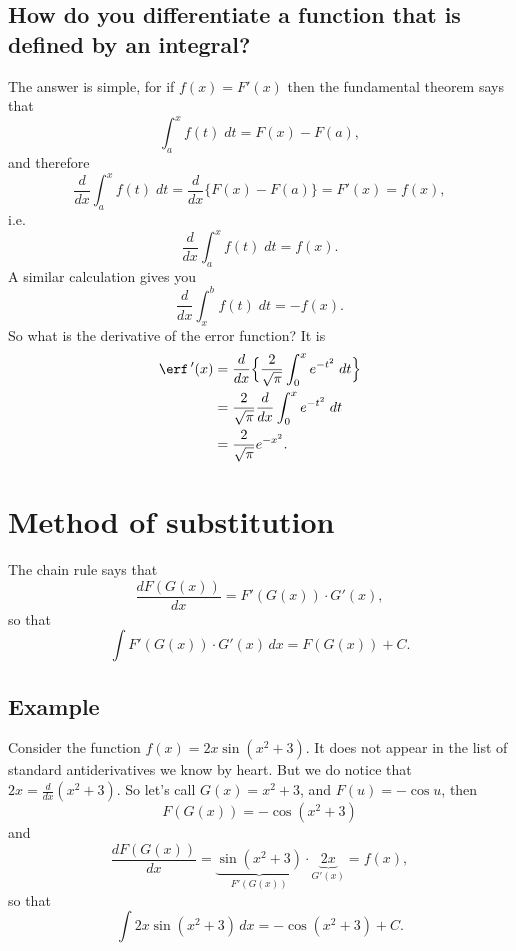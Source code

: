 \subsection{How do you differentiate a function that is defined by an integral?}
The answer is simple, for if $f(x) = F'(x)$ then the fundamental theorem says
that
\[
\int_a^x f(t) \; dt = F(x) - F(a),
\]
and therefore
\[
\frac d{dx} \int_a^x f(t) \; dt =\frac d{dx}\bigl\{ F(x) - F(a)\bigr\} = F'(x) =
f(x),
\]%
i.e.
\[
\frac d{dx} \int_a^x f(t) \; dt = f(x).
\]
A similar calculation gives you
\[
\frac d{dx} \int_x^b f(t) \; dt = -f(x).
\]
So what is the derivative of the error function?
It is
\begin{align*}
  \erf\, '(x) 
  &= \frac d{dx} \Bigl\{ \frac2{\sqrt\pi} \int _0 ^x e^{-t^2}\;dt\Bigr\} \\
  &= \frac2{\sqrt\pi} \frac d{dx} \int _0 ^x e^{-t^2}\;dt \\
  &=  \frac2{\sqrt\pi} e^{-x^2}.
\end{align*}


\section{Method of substitution}
\label{sec:method-substitution}
The chain rule says that
\[
\frac{d F(G(x))}{d x } = F'(G(x))\cdot G'(x),
\]
so that
\[
\int F'(G(x))\cdot G'(x) \,d x = F(G(x)) +C.
\]

\subsection{Example}
Consider the function $f(x) = 2x\sin (x^2+3)$. It does not appear in
the list of standard antiderivatives we know by heart. But we do
notice that $2x =
\frac{d}{dx} (x^2+3)$. So let's call $G(x)=x^2+3$, and $F(u) = -\cos
u$, then
\[
F(G(x)) = -\cos (x^2+3)
\]
and
\[
\frac{dF(G(x))}{dx} = \underbrace{\sin (x^2+3)}_{F'(G(x))}\cdot
\underbrace{2x}_{G'(x)} = f(x),
\]
so that
\begin{equation}
  \label{eq:substitution-example1}
  \int 2x\sin (x^2+3)\,d x = -\cos (x^2+3)+C.
\end{equation}




